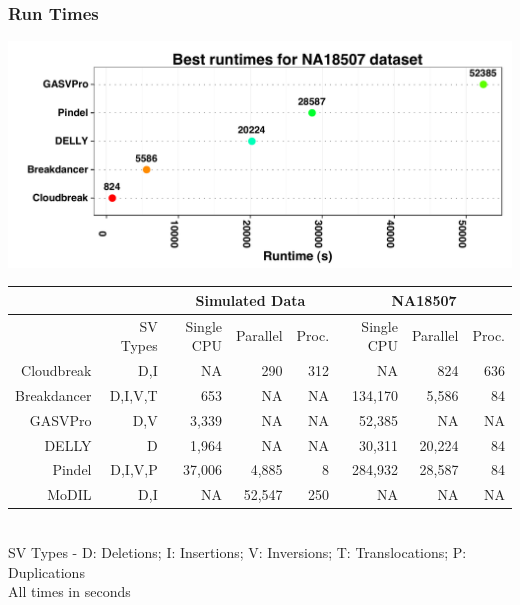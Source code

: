 \documentclass{beamer}
\begin{document}
\begin{frame}
  \frametitle{Run Times}
\begin{center}
  \includegraphics[width=.75\textwidth]{NA18507BestRuntimes_horizontal.pdf}
\end{center}
\fontsize{7.5pt}{10}\selectfont
\begin{center}
\begin{tabular}{r|r|rrr|rrr}
\multicolumn{2}{c}{}  & \multicolumn{3}{c}{Simulated Data} & \multicolumn{3}{c}{NA18507} \\
\hline
 & SV Types &  Single CPU & Parallel & Proc. &  Single CPU & Parallel & Proc.  \\ 
  \hline
  Cloudbreak & D,I &   NA    & 290 & 312    & NA         & 824 & 636 \\ 
  Breakdancer & D,I,V,T &  653   & NA       & NA          & 134,170 &  5,586 & 84 \\
  GASVPro & D,V   &  3,339  & NA       & NA         & 52,385  & NA & NA \\
  DELLY & D         &  1,964 & NA          & NA      & 30,311  & 20,224 & 84 \\
  Pindel & D,I,V,P         & 37,006 &  4,885     & 8          &  284,932  & 28,587 & 84 \\ 
  MoDIL & D,I        &  NA      & 52,547 & 250 & NA         & NA  & NA\\ 
   \hline
\end{tabular}
\\
SV Types - D: Deletions; I: Insertions; V: Inversions; T:
Translocations; P: Duplications \\
All times in seconds 
\end{center}
  \end{frame}



\end{document}
